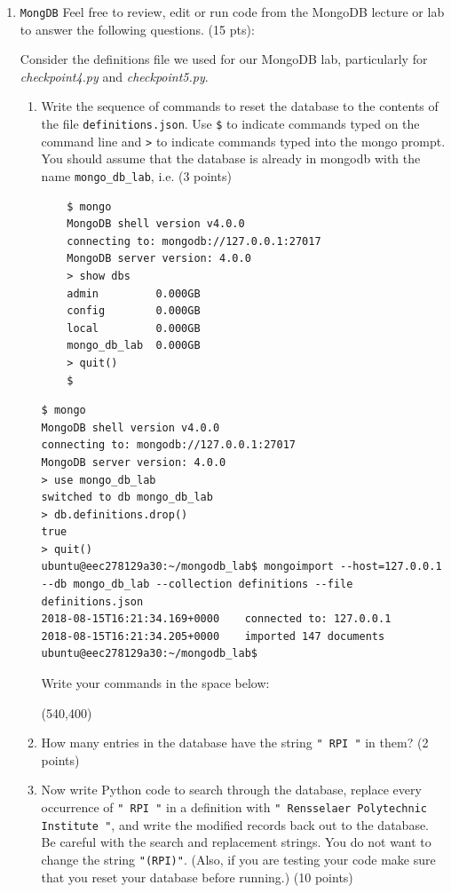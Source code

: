 \documentclass[10pt]{article}
\begin{document}
\begin{enumerate}
\newpage

\item \texttt{MongDB} Feel free to review, edit or run code from the MongoDB lecture or lab to answer the following questions. (15 pts):

	Consider the definitions file we used for our MongoDB lab, particularly for \textit{checkpoint4.py} and \textit{checkpoint5.py}. 
	\begin{enumerate}
	\item Write the sequence of commands to reset the database to the contents of the file \verb|definitions.json|. Use \verb|$| to indicate commands typed on the command line and \verb|>| to indicate commands typed into the mongo prompt. You should assume that the database is already in mongodb with the name \verb|mongo_db_lab|, i.e. (3 points)
	\begin{verbatim}
	$ mongo
	MongoDB shell version v4.0.0
	connecting to: mongodb://127.0.0.1:27017
	MongoDB server version: 4.0.0
	> show dbs
	admin         0.000GB
	config        0.000GB
	local         0.000GB
	mongo_db_lab  0.000GB
	> quit()
	$
	\end{verbatim}

\beginanswers

\begin{verbatim}
$ mongo
MongoDB shell version v4.0.0
connecting to: mongodb://127.0.0.1:27017
MongoDB server version: 4.0.0
> use mongo_db_lab
switched to db mongo_db_lab
> db.definitions.drop()
true
> quit()
ubuntu@eec278129a30:~/mongodb_lab$ mongoimport --host=127.0.0.1 --db mongo_db_lab --collection definitions --file definitions.json
2018-08-15T16:21:34.169+0000	connected to: 127.0.0.1
2018-08-15T16:21:34.205+0000	imported 147 documents
ubuntu@eec278129a30:~/mongodb_lab$ 
\end{verbatim}

\else
Write your commands in the space below:


\hspace*{-0.4in}\framebox(540,400){}
\fi

\newpage
\item How many entries in the database have the string \verb|" RPI "| in them? (2 points)
\beginanswers
{}
\bigskip
\else
\bigskip
\bigskip
\bigskip
\fi

\item Now write Python code to search through the database, replace every occurrence of \verb|" RPI "| in a definition with \verb|" Rensselaer Polytechnic Institute "|, and write the modified records back out to the database. Be careful with the search and replacement strings. You do not want to change the string \verb|"(RPI)"|. (Also, if you are testing your code make sure that you reset your database before running.) (10 points)


\end{enumerate}
\end{enumerate}
\end{document}
